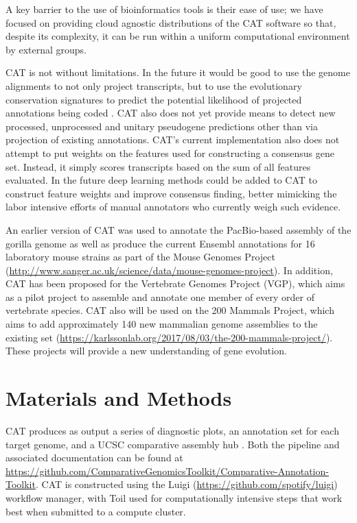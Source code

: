 \documentclass[fleqn,10pt]{wlscirep}
\begin{document}
A key barrier to the use of bioinformatics tools is their ease of use; we have focused on providing cloud agnostic distributions of the CAT software so that, despite its complexity, it can be run within a uniform computational environment by external groups. 

CAT is not without limitations. In the future it would be good to use the genome alignments to not only project transcripts, but to use the evolutionary conservation signatures to predict the potential likelihood of projected annotations being coded \cite{lin2011phylocsf}. CAT also does not yet provide means to detect new processed, unprocessed and unitary pseudogene predictions other than via projection of existing annotations. CAT’s current implementation also does not attempt to put weights on the features used for constructing a consensus gene set. Instead, it simply scores transcripts based on the sum of all features evaluated. In the future deep learning methods could be added to CAT to construct feature weights and improve consensus finding, better mimicking the labor intensive efforts of manual annotators who currently weigh such evidence. 

An earlier version of CAT was used to annotate the PacBio-based assembly of the gorilla genome \cite{gordon2016long} as well as produce the current Ensembl annotations for 16 laboratory mouse strains as part of the Mouse Genomes Project\cite{lilue2018multiple} (\url{http://www.sanger.ac.uk/science/data/mouse-genomes-project}). In addition, CAT has been proposed for the Vertebrate Genomes Project (VGP), which aims as a pilot project to assemble and annotate one member of every order of vertebrate species. CAT also will be used on the 200 Mammals Project, which aims to add approximately 140 new mammalian genome assemblies to the existing set (\url{https://karlssonlab.org/2017/08/03/the-200-mammals-project/}). These projects will provide a new understanding of gene evolution.

\section*{Materials and Methods}

CAT produces as output a series of diagnostic plots, an annotation set for each target genome, and a UCSC comparative assembly hub \cite{nguyen2014comparative}. Both the pipeline and associated documentation can be found at \url{https://github.com/ComparativeGenomicsToolkit/Comparative-Annotation-Toolkit}. CAT is constructed using the Luigi (\url{https://github.com/spotify/luigi}) workflow manager, with Toil \cite{vivian2017toil} used for computationally intensive steps that work best when submitted to a compute cluster. 
\end{document}
